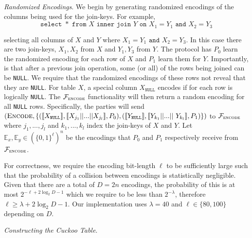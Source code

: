 \documentclass[11pt,letterpaper]{article}
\newcommand{\Party}[1]{\ensuremath{P_{#1}}\xspace}
\newcommand{\share}[1]{\ensuremath{\llbracket #1\rrbracket}\xspace}
\newcommand{\Null}{\texttt{NULL}\xspace}
\newcommand{\XNull}{\ensuremath{X_\Null}\xspace}
\newcommand{\YNull}{\ensuremath{Y_\Null}\xspace}
\renewcommand{\paragraph}[1]{\vspace{0.1cm}\noindent\emph{#1}.} %
\newcommand{\f}[1]{\ensuremath{\mathcal{F}_{\textsc{#1}}}}
\providecommand{\DIFaddtex}[1]{{\protect\color{blue}\uwave{#1}}} %
\providecommand{\DIFaddbegin}{} %
\providecommand{\DIFaddend}{} %
\providecommand{\DIFdelbegin}{} %
\providecommand{\DIFadd}[1]{\texorpdfstring{\DIFaddtex{#1}}{#1}} %
\begin{document}
\paragraph{Randomized Encodings\DIFaddbegin \DIFadd{.}\DIFaddend }
We begin by generating randomized encodings of the columns being used for the join-keys. For example, 
\iffullversion
$$
	\texttt{select }* \texttt{ from } X \texttt{ inner join } Y \texttt{ on } X_1 = Y_1 \texttt{ and } X_2 = Y_3
$$

\else
selecting all columns of $X$ and $Y$ where $X_1 = Y_1 \texttt{ and } X_2 = Y_3$.
\fi
In this case there are two join-keys, $X_1,X_2$ from $X$ and $Y_1,Y_3$ from $Y$. The protocol has \Party{0} learn the randomized encoding for each row of $X$ and \Party{1} learn them for $Y$. Importantly, is that after a previous join operation, some (or all) of the rows being joined can be \texttt{NULL}. We require that the randomized encodings of these rows not reveal that they are \texttt{NULL}. For table $X$, a special column $\XNull$ encodes if for each row is logically \texttt{NULL}. The \f{encode} functionality will then return a random encoding for all \texttt{NULL} rows. Specifically, the parties will send $(\textsc{Encode}, \{(\share{\XNull}, \share{X_{j_1}||...||X_{j_l}}, \Party{0}), (\share{\YNull}, \share{Y_{k_1}||...||$ $Y_{k_l}}, \Party{1})\})$ to \f{encode} where $j_1,...,j_l$ and $k_1,...,k_l$ index the join-keys of $X$ and $Y$. Let $\mathbb{E}_x,\mathbb{E}_y\in(\{0,1\}^{\ell})^n$ be the encodings that \Party{0} and \Party{1} respectively receive from \f{encode}.


For correctness, we require the encoding bit-length $\ell$ to be sufficiently large such that the probability of a collision between encodings is statistically negligible. Given that there are a total of $D=2n$ encodings, the probability of this is at most $2^{-\ell+2\log_2 D-1}$ which we require to be less than $2^{-\lambda}$, therefore $\ell\geq \lambda+2\log_2 D -1$. Our implementation uses $\lambda=40$ and $\ell\in\{80,100\}$ depending on $D$.




\paragraph{Constructing the Cuckoo Table\DIFaddbegin \DIFadd{.}\DIFaddend }
\DIFdelbegin %
\end{document}
